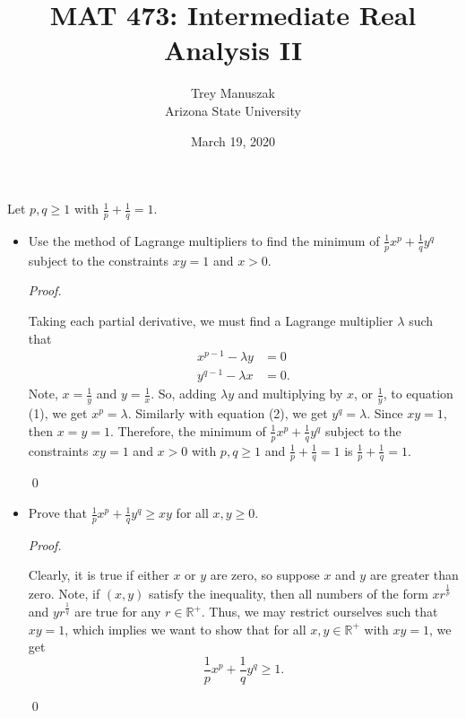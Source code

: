 \documentclass[12pt]{article}
\title{MAT 473: Intermediate Real Analysis II}
\date{March 19, 2020}
\author{Trey Manuszak\\ Arizona State University}
\newenvironment{problem}[2][Problem]{\begin{trivlist}
\item[\hskip \labelsep {\bfseries #1}\hskip \labelsep {\bfseries #2.}]}{\end{trivlist}}
\newenvironment{sol}
    {\emph{Proof.}
    }
    {
    \qed
    }
\begin{document}




\maketitle
\newpage





\begin{problem}{25}
Let $p,q \geq 1$ with $\frac{1}{p} + \frac{1}{q} = 1$. \begin{itemize}
    \item[(a)] Use the method of Lagrange multipliers to find the minimum of $\frac{1}{p}x^p + \frac{1}{q}y^q$ subject to the constraints $xy = 1$ and $x > 0$.
    
    \begin{sol}
    Taking each partial derivative, we must find a Lagrange multiplier $\lambda$ such that \begin{align}
        x^{p-1} - \lambda y &= 0 \\ y^{q-1} - \lambda x &= 0.
    \end{align} Note, $x = \frac{1}{y}$ and $y = \frac{1}{x}$. So, adding $\lambda y$ and multiplying by $x$, or $\frac{1}{y}$, to equation (1), we get $x^p = \lambda$. Similarly with equation (2), we get $y^q = \lambda$. Since $xy = 1$, then $x = y = 1$. Therefore, the minimum of $\frac{1}{p}x^p + \frac{1}{q}y^q$ subject to the constraints $xy = 1$ and $x > 0$ with $p,q \geq 1$ and $\frac{1}{p} + \frac{1}{q} = 1$ is $\frac{1}{p} + \frac{1}{q} = 1$.
    \end{sol}
    
    \item[(b)] Prove that $\frac{1}{p}x^p + \frac{1}{q}y^q \geq xy$ for all $x,y \geq 0$.
    
    \begin{sol}
    Clearly, it is true if either $x$ or $y$ are zero, so suppose $x$ and $y$ are greater than zero. Note, if $(x,y)$ satisfy the inequality, then all numbers of the form $xr^{\frac{1}{p}}$ and $yr^{\frac{1}{q}}$ are true for any $r \in \mathbb{R}^+$. Thus, we may restrict ourselves such that $xy = 1$, which implies we want to show that for all $x,y \in \mathbb{R}^+$ with $xy=1$, we get $$\frac{1}{p}x^p + \frac{1}{q}y^q \geq 1.$$ 
    

\end{sol}
\end{itemize}
\end{problem}
\end{document}
